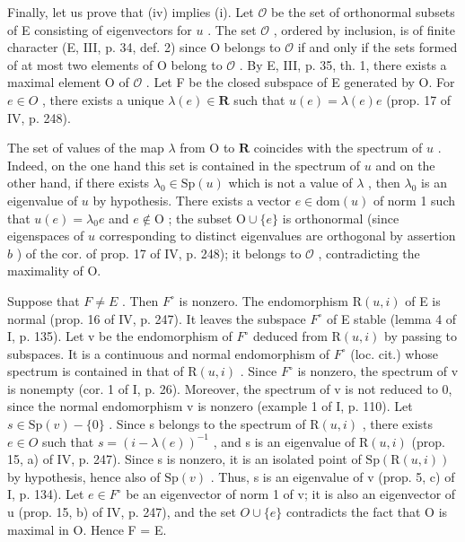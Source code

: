 Finally, let us prove that (iv) implies (i). Let \(\mathcal{O}\) be the set of orthonormal subsets of E consisting of eigenvectors for \(u\) . The set \(\mathcal{O}\) , ordered by inclusion, is of finite character (E, III, p. 34, def. 2) since O belongs to \(\mathcal{O}\) if and only if the sets formed of at most two elements of O belong to \(\mathcal{O}\) . By E, III, p. 35, th. 1, there exists a maximal element O of \(\mathcal{O}\) . Let F be the closed subspace of E generated by O. For \(e \in O\) , there exists a unique \(\lambda(e) \in \mathbf{R}\) such that \(u(e) = \lambda(e)e\) (prop. 17 of IV, p. 248).

The set of values of the map \(\lambda\) from O to \(\mathbf{R}\) coincides with the spectrum of \(u\) . Indeed, on the one hand this set is contained in the spectrum of \(u\) and on the other hand, if there exists \(\lambda_0 \in \mathrm{Sp}(u)\) which is not a value of \(\lambda\) , then \(\lambda_0\) is an eigenvalue of \(u\) by hypothesis. There exists a vector \(e \in \mathrm{dom}(u)\) of norm 1 such that \(u(e) = \lambda_0 e\) and \(e \notin \mathrm{O}\) ; the subset \(\mathrm{O} \cup \{e\}\) is orthonormal (since eigenspaces of \(u\) corresponding to distinct eigenvalues are orthogonal by assertion \(b\) ) of the cor. of prop. 17 of IV, p. 248); it belongs to \(\mathcal{O}\) , contradicting the maximality of O.

Suppose that \(F \neq E\) . Then \(F^{\circ}\) is nonzero. The endomorphism \(\mathrm{R}(u,i)\) of E is normal (prop. 16 of IV, p. 247). It leaves the subspace \(F^{\circ}\) of E stable (lemma 4 of I, p. 135). Let v be the endomorphism of \(F^{\circ}\) deduced from \(\mathrm{R}(u,i)\) by passing to subspaces. It is a continuous and normal endomorphism of \(F^{\circ}\) (loc. cit.) whose spectrum is contained in that of \(\mathrm{R}(u,i)\) . Since \(F^{\circ}\) is nonzero, the spectrum of v is nonempty (cor. 1 of I, p. 26). Moreover, the spectrum of v is not reduced to 0, since the normal endomorphism v is nonzero (example 1 of I, p. 110). Let \(s \in \mathrm{Sp}(v) - \{0\}\) . Since s belongs to the spectrum of \(\mathrm{R}(u,i)\) , there exists \(e \in O\) such that \(s = (i - \lambda(e))^{-1}\) , and s is an eigenvalue of \(\mathrm{R}(u,i)\) (prop. 15, a) of IV, p. 247). Since s is nonzero, it is an isolated point of \(\mathrm{Sp}(\mathrm{R}(u,i))\) by hypothesis, hence also of \(\mathrm{Sp}(v)\) . Thus, s is an eigenvalue of v (prop. 5, c) of I, p. 134). Let \(e \in F^{\circ}\) be an eigenvector of norm 1 of v; it is also an eigenvector of u (prop. 15, b) of IV, p. 247), and the set \(O \cup \{e\}\) contradicts the fact that O is maximal in O. Hence F = E.

